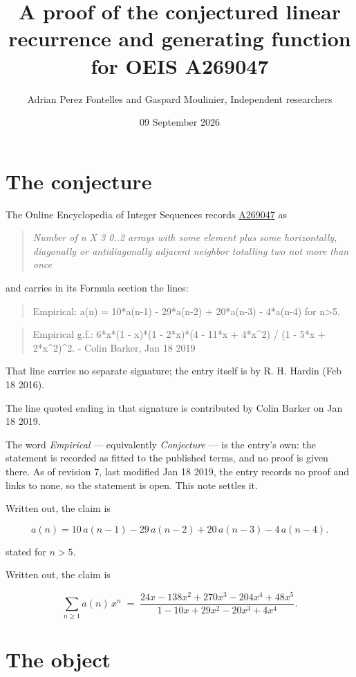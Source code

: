 \documentclass[11pt]{article}
\title{A proof of the conjectured linear recurrence and generating function for OEIS A269047}
\author{Adrian Perez Fontelles and Gaspard Moulinier, Independent researchers}
\date{09 September 2026}
\theoremstyle{definition}
\begin{document}
\maketitle
\section{The conjecture}

The Online Encyclopedia of Integer Sequences records \href{https://oeis.org/A269047}{A269047} as

\begin{quote}\itshape Number of n X 3 0..2 arrays with some element plus some horizontally, diagonally or antidiagonally adjacent neighbor totalling two not more than once\end{quote}

and carries in its Formula section the lines:

\begin{quote}\ttfamily Empirical: a(n) = 10*a(n-1) - 29*a(n-2) + 20*a(n-3) - 4*a(n-4) for n>5.\end{quote}

\begin{quote}\ttfamily Empirical g.f.: 6*x*(1 - x)*(1 - 2*x)*(4 - 11*x + 4*x\textasciicircum{}2) / (1 - 5*x + 2*x\textasciicircum{}2)\textasciicircum{}2. - Colin Barker, Jan 18 2019\end{quote}

That line carries no separate signature; the entry itself is by R. H. Hardin (Feb 18 2016).

The line quoted ending in that signature is contributed by Colin Barker on Jan 18 2019.

The word {\itshape Empirical} --- equivalently {\itshape Conjecture} --- is the entry's own: the statement is recorded as fitted to the published terms, and no proof is given there. As of revision 7, last modified Jan 18 2019, the entry records no proof and links to none, so the statement is open. This note settles it.

Written out, the claim is

\[a(n) = 10\,a(n-1) - 29\,a(n-2) + 20\,a(n-3) - 4\,a(n-4).\]

stated for $n > 5$.

Written out, the claim is

\[\sum_{n \ge 1} a(n)\,x^n \;=\; \frac{24x - 138x^{2} + 270x^{3} - 204x^{4} + 48x^{5}}{1 - 10x + 29x^{2} - 20x^{3} + 4x^{4}}.\]

\section{The object}
\end{document}
